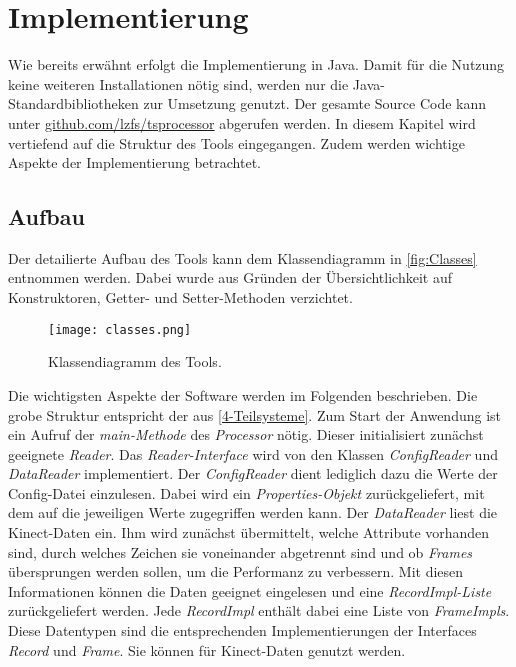 \chapter{Implementierung}
\label{chapter5}
Wie bereits erwähnt erfolgt die Implementierung in Java.
Damit für die Nutzung keine weiteren Installationen nötig sind,
werden nur die Java-Standardbibliotheken zur Umsetzung genutzt.
Der gesamte Source Code kann unter \href{https://github.com/lzfs/tsprocessor}{github.com/lzfs/tsprocessor}
abgerufen werden.
In diesem Kapitel wird vertiefend auf die Struktur des Tools eingegangen.
Zudem werden wichtige Aspekte der Implementierung betrachtet.

\section{Aufbau}
\label{5-Aufbau}
Der detailierte Aufbau des Tools kann dem Klassendiagramm in \autoref{fig:Classes} entnommen werden.
Dabei wurde aus Gründen der Übersichtlichkeit auf Konstruktoren,
Getter- und Setter-Methoden verzichtet.
\begin{figure}[p]
    \begin{center}
        \texttt{[image: classes.png]}
    \end{center}
    \caption{Klassendiagramm des Tools.}
    \label{fig:Classes}
\end{figure}
Die wichtigsten Aspekte der Software werden im Folgenden beschrieben.
Die grobe Struktur entspricht der aus \autoref{4-Teilsysteme}.
Zum Start der Anwendung ist ein Aufruf der \emph{main-Methode} des \emph{Processor} nötig.
Dieser initialisiert zunächst geeignete \emph{Reader}.
Das \emph{Reader-Interface} wird von den Klassen \emph{ConfigReader} und \emph{DataReader} implementiert.
Der \emph{ConfigReader} dient lediglich dazu die Werte der Config-Datei einzulesen.
Dabei wird ein \emph{Properties-Objekt} zurückgeliefert,
mit dem auf die jeweiligen Werte zugegriffen werden kann.
Der \emph{DataReader} liest die Kinect-Daten ein.
Ihm wird zunächst übermittelt, welche Attribute vorhanden sind,
durch welches Zeichen sie voneinander abgetrennt sind
und ob \emph{Frames} übersprungen werden sollen,
um die Performanz zu verbessern.
Mit diesen Informationen können die Daten geeignet eingelesen und eine \emph{RecordImpl-Liste} zurückgeliefert werden.
Jede \emph{RecordImpl} enthält dabei eine Liste von \emph{FrameImpls}.
Diese Datentypen sind die entsprechenden Implementierungen der Interfaces \emph{Record} und \emph{Frame}.
Sie können für Kinect-Daten genutzt werden.
